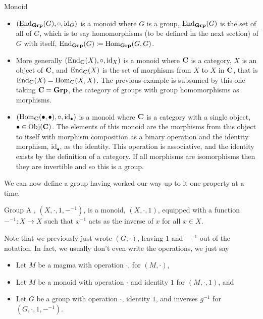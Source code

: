 \begin{exm}{Monoid}{}
\begin{itemize}
        \item \((\operatorname{End}_{\mathbf{Grp}}(G), \circ, \mathrm{id}_G)\) is a monoid where \(G\) is a group, \(\operatorname{End}_{\mathbf{Grp}}(G)\) is the set of all  of \(G\), which is to say homomorphisms (to be defined in the next section) of \(G\) with itself, \(\operatorname{End}_{\mathbf{Grp}}(G) \coloneqq \operatorname{Hom}_{\mathbf{Grp}}(G, G)\).
        
        \item More generally \((\operatorname{End}_{\mathbf{C}}(X), \circ, \mathrm{id}_X)\) is a monoid where \(\mathbf{C}\) is a category, \(X\) is an object of \(\mathbf{C}\), and \(\operatorname{End}_{\mathbf{C}}(X)\) is the set of morphisms from \(X\) to \(X\) in \(\mathbf{C}\), that is \(\operatorname{End}_{\mathbf{C}}(X) = \operatorname{Hom}_{\mathbf{C}}(X, X)\).
        The previous example is subsumed by this one taking \(\mathbf{C} = \mathbf{Grp}\), the category of groups with group homomorphisms as morphisms.
        
        \item \((\operatorname{Hom}_{\mathbf{C}}(\bullet, \bullet), \circ, \mathrm{id}_{\bullet})\) is a monoid where \(\mathbf{C}\) is a category with a single object, \(\bullet \in \operatorname{Obj}(\mathbf{C})\).
        The elements of this monoid are the morphisms from this object to itself with morphism composition as a binary operation and the identity morphism, \(\mathrm{id}_{\bullet}\), as the identity.
        This operation is associative, and the identity exists by the definition of a category.
        If all morphisms are isomorphisms then they are invertible and so this is a group.
    \end{itemize}
\end{exm}

We can now define a group having worked our way up to it one property at a time.

\begin{dfn}{Group}{}
    A , \((X, \cdot, 1, -^{-1})\), is a monoid, \((X, \cdot, 1)\), equipped with a function \(-^{-1} \colon X \to X\) such that \(x^{-1}\) acts as the inverse of \(x\) for all \(x\in X\).
\end{dfn}
Note that we previously just wrote \((G, \cdot)\), leaving \(1\) and \(-^{-1}\) out of the notation.
In fact, we usually don't even write the operations, we just say
\begin{itemize}
    \item Let \(M\) be a magma with operation \(\cdot\), for \((M, \cdot)\),
    \item Let \(M\) be a monoid with operation \(\cdot\) and identity \(1\) for \((M, \cdot, 1)\), and
    \item Let \(G\) be a group with operation \(\cdot\), identity \(1\), and inverses \(g^{-1}\) for \((G, \cdot, 1, -^{-1})\).
\end{itemize}


